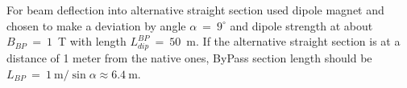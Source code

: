 \documentclass[25pt, a0paper, portrait, blockverticalspace=.5cm]{tikzposter}
\begin{document}
\begin{columns}
{\begin{minipage}{0.514\linewidth}
		\end{minipage}
		\begin{minipage}{0.486\linewidth}
		\end{minipage}
\newline
\par For beam deflection into alternative straight section used dipole magnet and chosen to make a deviation by angle $\alpha~=~9^\circ$ and dipole strength at about $B_{BP}~=~1$~T with length $L^{BP}_{dip}~=~50$~m. If the alternative straight section is at a distance of 1 meter from the native ones, ByPass section length should be $L_{BP}~=~1~\text{m}/\sin{\alpha}\approx6.4~\text{m}$.}
	

\end{columns}
\end{document}
